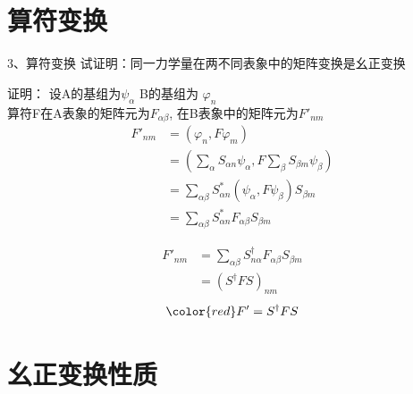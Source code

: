 \section{算符变换}
\begin{frame} 
    \begin{tcolorbox1}{3、算符变换}
        试证明：同一力学量在两不同表象中的矩阵变换是幺正变换  
    \end{tcolorbox1}
    \alert{证明：} 设A的基组为$\psi_\alpha$ B的基组为 $\varphi_n$\\
    算符F在A表象的矩阵元为$F_{\alpha\beta}$, 在B表象中的矩阵元为$F'_{nm}$
    \begin{equation*}
        \begin{split}
            F'_{nm} &= (\varphi_n, F\varphi_m) \\
            &= (\sum_{\alpha} S_{\alpha n}\psi_\alpha, F \sum_{\beta} S_{\beta m}\psi_\beta)\\
            &= \sum_{\alpha\beta} S_{\alpha n} ^* (\psi_\alpha, F \psi_\beta) S_{\beta m}\\
            &= \sum_{\alpha\beta} S_{\alpha n} ^* F_{\alpha\beta} S_{\beta m}
        \end{split} 
    \end{equation*}
\end{frame}


\begin{frame} 
    \begin{equation*}
    \begin{split}
        F'_{nm} &= \sum_{\alpha\beta} S_{n\alpha } ^{\dagger} F_{\alpha\beta} S_{\beta m} \\
        &= (S^{\dagger} F S)_{nm}
    \end{split} 
    \end{equation*} 
    $$\color{red} F'= S^{\dagger} F S $$
\end{frame}

\section{幺正变换性质}

